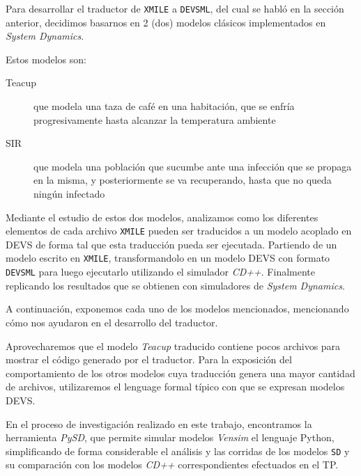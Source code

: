 Para desarrollar el traductor de \texttt{XMILE} a \texttt{DEVSML}, del cual se habló en la sección anterior, decidimos basarnos en 2 (dos) modelos clásicos implementados en \textit{System Dynamics}. 

Estos modelos son: 
\begin{description}
	\item[Teacup] que modela una taza de café en una habitación, que se enfría progresivamente hasta alcanzar la temperatura ambiente
	\item[SIR] 	que modela una población que sucumbe ante una infección que se propaga en la misma, y posteriormente se va recuperando, hasta que no queda ningún infectado
\end{description}

Mediante el estudio de estos dos modelos, analizamos como los diferentes elementos de cada archivo \texttt{XMILE} pueden ser traducidos a un modelo acoplado en DEVS  de forma tal que esta traducción pueda ser ejecutada. 
Partiendo de un modelo escrito en \texttt{XMILE}, transformandolo en un modelo DEVS con formato \texttt{DEVSML} para luego ejecutarlo utilizando el simulador \textit{CD++}. Finalmente replicando los resultados que se obtienen con simuladores de \textit{System Dynamics}.


A continuación, exponemos cada uno de los modelos mencionados, mencionando cómo nos ayudaron en el desarrollo del traductor. 

Aprovecharemos que el modelo \textit{Teacup} traducido contiene pocos archivos para mostrar el código generado por el traductor. Para la exposición del comportamiento de los otros modelos cuya traducción genera una mayor cantidad de archivos, utilizaremos el lenguage formal típico con que se expresan modelos DEVS.

En el proceso de investigación realizado en este trabajo, encontramos la herramienta \textit{PySD}\cite{pysd}, que permite simular modelos \textit{Vensim} el lenguaje Python, simplificando de forma considerable el análisis y las corridas de los modelos \texttt{SD} y su comparación con los modelos \textit{CD++} correspondientes efectuados en el TP.
